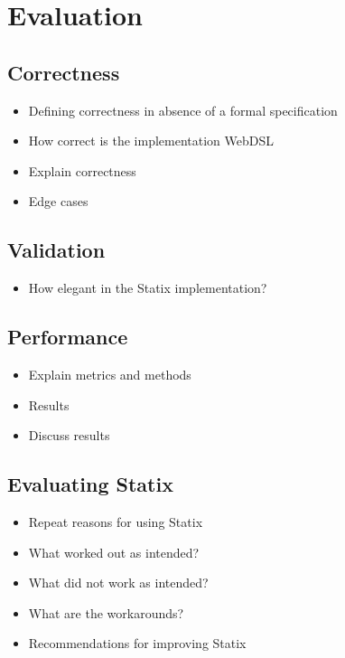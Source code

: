 
\chapter{\label{chap:evaluation}Evaluation}

\section{Correctness}

  \begin{itemize}
    \item Defining correctness in absence of a formal specification
    \item How correct is the implementation WebDSL
    \item Explain correctness
    \item Edge cases
  \end{itemize}

\section{Validation}

  \begin{itemize}
    \item How elegant in the Statix implementation?
  \end{itemize}

\section{Performance}

  \begin{itemize}
    \item Explain metrics and methods
    \item Results
    \item Discuss results
  \end{itemize}

\section{Evaluating Statix}

  \begin{itemize}
    \item Repeat reasons for using Statix
    \item What worked out as intended?
    \item What did not work as intended?
    \item What are the workarounds?
    \item Recommendations for improving Statix
  \end{itemize}
